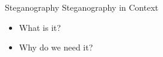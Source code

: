 \begin{frame}{Steganography}{}
	Steganography in Context
	\begin{itemize}
		\item What is it?
		\item Why do we need it?
	\end{itemize}
\end{frame}
